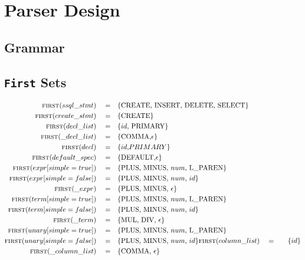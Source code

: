 \documentclass{article}
\begin{document}
\section{Parser Design}

\subsection{Grammar}

\subsection{\texttt{First} Sets}
\begin{align*}
\textsc{first}(ssql\_stmt) \quad =& \quad\{\text{CREATE, INSERT, DELETE, SELECT}\} \\
\textsc{first}(create\_stmt) \quad =& \quad\{\text{CREATE}\} \\
\textsc{first}(decl\_list) \quad =& \quad\{id\text{, PRIMARY}\} \\
\textsc{first}(\_decl\_list) \quad =& \quad\{\text{COMMA,} \epsilon\} \\
\textsc{first}(decl) \quad =& \quad\{{id\text, PRIMARY}\} \\
\textsc{first}(default\_spec) \quad =& \quad\{\text{DEFAULT,} \epsilon\} \\
\textsc{first}(expr[simple=true]) \quad =& \quad\{\text{PLUS, MINUS, } num \text{, L\_PAREN}\} \\
\textsc{first}(expr[simple=false]) \quad =& \quad\{\text{PLUS, MINUS, }num\text{, }id\} \\
\textsc{first}(\_expr) \quad =& \quad\{\text{PLUS, MINUS, }\epsilon\} \\
\textsc{first}(term[simple=true]) \quad =& \quad\{\text{PLUS, MINUS, }num\text{, L\_PAREN}\} \\
\textsc{first}(term[simple=false]) \quad =& \quad\{\text{PLUS, MINUS, }num\text{, }id\} \\
\textsc{first}(\_term) \quad =& \quad\{\text{MUL, DIV, }\epsilon\} \\
\textsc{first}(unary[simple=true]) \quad =& \quad\{\text{PLUS, MINUS, } num \text{, L\_PAREN}\} \\
\textsc{first}(unary[simple=false]) \quad =& \quad\{\text{PLUS, MINUS, }num\text{, }id\}
\textsc{first}(column\_list) \quad =& \quad\{id\} \\
\textsc{first}(\_column\_list) \quad =& \quad\{\text{COMMA, }\epsilon\} \\

\end{align*}
\end{document}
